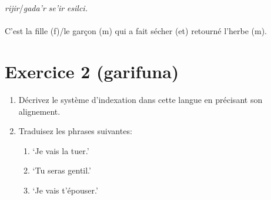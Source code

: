 \documentclass[oldfontcommands,twoside,a4paper,12pt]{article}
\newcommand{\ipa}[1]{{\phon\textit{#1}}}
\begin{document}
\begin{exe}
\ex
\gll \ipa{Xhın} \ipa{rijir}/\ipa{gada'r} \ipa{se’ir} \ipa{esilci.}\\
\\
\glt C’est la fille (f)/le garçon (m) qui a fait sécher (et) retourné l’herbe  (m).
\end{exe} 


\section*{Exercice 2 (garifuna)}

\begin{enumerate}
\item Décrivez le système d'indexation dans cette langue en précisant son alignement.
\item Traduisez les phrases suivantes: 
\begin{enumerate}
\item `Je vais la tuer.'
\item `Tu seras gentil.'
\item `Je vais t'épouser.'
\end{enumerate}
\end{enumerate}
\end{document}
